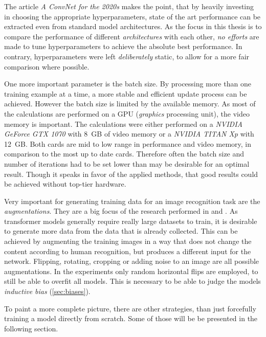 The article \emph{A ConvNet for the 2020s} \cite{convNetForThe2020s} makes the point, that by heavily investing in choosing the appropriate hyperparameters, state of the art performance can be extracted even from \glqq standard\grqq{} model architectures. 
As the focus in this thesis is to compare the performance of different \emph{architectures} with each other, \emph{no efforts} are made to tune hyperparameters to achieve the absolute best performance. 
In contrary, hyperparameters were left \emph{deliberately} static, to allow for a more fair comparison where possible.

One more important parameter is the batch size. 
By processing more than one training example at a time, a more stable and efficient update process can be achieved.
However the batch size is limited by the available memory. 
As most of the calculations are performed on a GPU (\emph{graphics} processing unit), the video memory is important. 
The calculations were either performed on a \emph{NVIDIA GeForce GTX 1070} with \SI[]{8}[]{GB} of video memory or a \emph{NVIDIA TITAN Xp} with \SI[]{12}[]{GB}. 
Both cards are mid to low range in performance and video memory, in comparison to the most up to date cards. 
Therefore often the batch size and number of iterations had to be set lower than may be desirable for an optimal result. Though it speaks in favor of the applied methods, that good results could be achieved without top-tier hardware.

Very important for generating training data for an image recognition task are the \emph{augmentations}. 
They are a big focus of the research performed in \cite{convNetForThe2020s} and \cite{dinoPaper}.
As transformer models generally require really large datasets to train, it is desirable to generate more data from the data that is already collected. 
This can be achieved by augmenting the training images in a way that does not change the content according to human recognition, but produces a different input for the network.
Flipping, rotating, cropping or adding noise to an image are all possible augmentations. 
In the experiments only random horizontal flips are employed, to still be able to overfit all models. 
This is necessary to be able to judge the models \emph{inductive bias} (\autoref{sec:biases}).

To paint a more complete picture, there are other strategies, than just forcefully training a model directly from scratch. 
Some of those will be be presented in the following section.